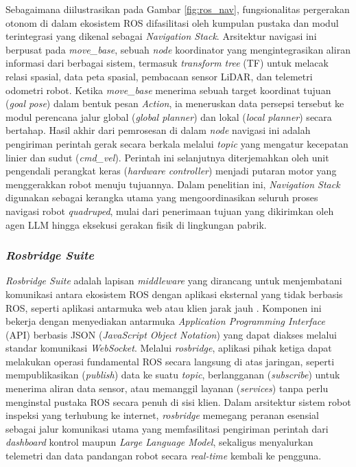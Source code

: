Sebagaimana diilustrasikan pada Gambar \ref{fig:ros_nav}, fungsionalitas pergerakan otonom di dalam ekosistem ROS difasilitasi oleh kumpulan pustaka dan modul terintegrasi yang dikenal sebagai \textit{Navigation Stack}. Arsitektur navigasi ini berpusat pada \textit{move\_base}, sebuah \textit{node} koordinator yang mengintegrasikan aliran informasi dari berbagai sistem, termasuk \textit{transform tree} (TF) untuk melacak relasi spasial, data peta spasial, pembacaan sensor LiDAR, dan telemetri odometri robot. Ketika \textit{move\_base} menerima sebuah target koordinat tujuan (\textit{goal pose}) dalam bentuk pesan \textit{Action}, ia meneruskan data persepsi tersebut ke modul perencana jalur global (\textit{global planner}) dan lokal (\textit{local planner}) secara bertahap. Hasil akhir dari pemrosesan di dalam \textit{node} navigasi ini adalah pengiriman perintah gerak secara berkala melalui \textit{topic} yang mengatur kecepatan linier dan sudut (\textit{cmd\_vel}). Perintah ini selanjutnya diterjemahkan oleh unit pengendali perangkat keras (\textit{hardware controller}) menjadi putaran motor yang menggerakkan robot menuju tujuannya. Dalam penelitian ini, \textit{Navigation Stack} digunakan sebagai kerangka utama yang mengoordinasikan seluruh proses navigasi robot \textit{quadruped}, mulai dari penerimaan tujuan yang dikirimkan oleh agen LLM hingga eksekusi gerakan fisik di lingkungan pabrik.

\subsubsection{\textit{Rosbridge Suite}}
\textit{Rosbridge Suite} adalah lapisan \textit{middleware} yang dirancang untuk menjembatani komunikasi antara ekosistem ROS dengan aplikasi eksternal yang tidak berbasis ROS, seperti aplikasi antarmuka web atau klien jarak jauh \cite{crick2016rosbridge}. Komponen ini bekerja dengan menyediakan antarmuka \textit{Application Programming Interface} (API) berbasis JSON (\textit{JavaScript Object Notation}) yang dapat diakses melalui standar komunikasi \textit{WebSocket}. Melalui \textit{rosbridge}, aplikasi pihak ketiga dapat melakukan operasi fundamental ROS secara langsung di atas jaringan, seperti mempublikasikan (\textit{publish}) data ke suatu \textit{topic}, berlangganan (\textit{subscribe}) untuk menerima aliran data sensor, atau memanggil layanan (\textit{services}) tanpa perlu menginstal pustaka ROS secara penuh di sisi klien. Dalam arsitektur sistem robot inspeksi yang terhubung ke internet, \textit{rosbridge} memegang peranan esensial sebagai jalur komunikasi utama yang memfasilitasi pengiriman perintah dari \textit{dashboard} kontrol maupun \textit{Large Language Model}, sekaligus menyalurkan telemetri dan data pandangan robot secara \textit{real-time} kembali ke pengguna.


